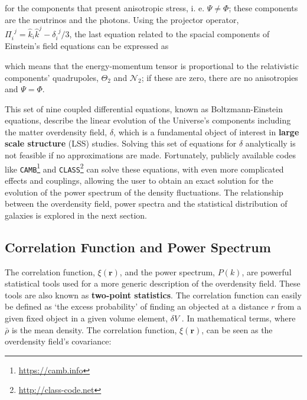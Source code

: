 for the components that present anisotropic stress, i. e. $\Psi \neq \Phi$; these components are the neutrinos and the photons. Using the projector operator, $\Pi_i^{\ \ j} = \hat{k}_i\hat{k}^j  - \delta_i^{\ \ j}/3$, the last equation related to the spacial components of Einstein's field equations can be expressed as \citep[][p. 124]{dods}

which means that the energy-momentum tensor is proportional to the relativistic components' quadrupoles, $\Theta_2$ and $\mathcal{N}_2$; if these are zero, there are no anisotropies and $\Psi = \Phi$.

\qquad This set of nine coupled differential equations, known as Boltzmann-Einstein equations, describe the linear evolution of the Universe's components including the matter overdensity field, $\delta$, which is a fundamental object of interest in \textbf{large scale structure} (LSS) studies. Solving this set of equations for $\delta$ analytically is not feasible if no approximations are made. Fortunately, publicly available codes like \texttt{CAMB}\footnote{\url{https://camb.info}} \citep{CAMB} and \texttt{CLASS}\footnote{\url{http://class-code.net}} \citep{Class} can solve these equations, with even more complicated effects and couplings, allowing the user to obtain an exact solution for the evolution of the power spectrum of the density fluctuations. The relationship between the overdensity field, power spectra and the statistical distribution of galaxies is explored in the next section.

\subsection{Correlation Function and Power Spectrum}\label{Sec:Intro:Pk}
The correlation function, $\xi (\textbf{r})$, and the power spectrum, $P(k)$, are powerful statistical tools used for a more generic description of the overdensity field. These tools are also known as \textbf{two-point statistics}. The correlation function can easily be defined as `the excess probability' of finding an objected at a distance $r$ from a given fixed object in a given volume element, $\delta V$ \citep{Peebles1973}. In mathematical terms,
where $\bar{\rho}$ is the mean density. The correlation function, $\xi(\textbf{r})$, can be seen as the overdensity field's covariance:

